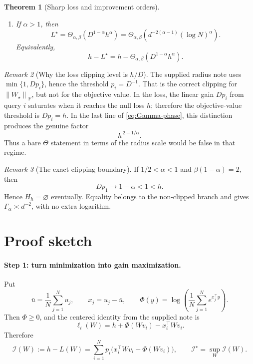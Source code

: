 \documentclass[11pt]{article}
\newtheorem{theorem}{Theorem}[section]
\theoremstyle{remark}
\newtheorem{remark}[theorem]{Remark}
\newcommand{\norm}[1]{\left\lVert #1\right\rVert}
\newcommand{\Frob}{\mathrm F}
\newcommand{\cI}{\mathcal I}
\begin{document}
\begin{theorem}[Sharp loss and improvement orders]
\begin{enumerate}[label=(\roman*)]
\item If \(\alpha>1\), then
\begin{equation}
 \boxed{\qquad
 L^\star
 =\Theta_{\alpha,\beta}\!\left(D^{1-\alpha}h^\alpha\right)
 =\Theta_{\alpha,\beta}\!\left(
 d^{-2(\alpha-1)}(\log N)^\alpha\right).
 \qquad}
 \label{eq:main-supercritical}
\end{equation}
Equivalently,
\[
 h-L^\star
 =h-\Theta_{\alpha,\beta}\!\left(D^{1-\alpha}h^\alpha\right).
\]
\end{enumerate}
\end{theorem}

\begin{remark}[Why the loss clipping level is \(h/D\)]
\label{rem:two-clippings}
The supplied radius note uses
\(\min\{1,Dp_i\}\), hence the threshold \(p_i=D^{-1}\).
That is the correct clipping for \(\norm{W_\star}_{\Frob}\), but not
for the objective value.  In the loss, the linear gain \(Dp_i\) from
query \(i\) saturates when it reaches the null loss \(h\); therefore
the objective-value threshold is \(Dp_i=h\).
In the last line of \eqref{eq:Gamma-phase}, this distinction produces
the genuine factor
\[
 h^{\,2-1/\alpha}.
\]
Thus a bare \(\Theta\) statement in terms of the radius scale would be
false in that regime.
\end{remark}

\begin{remark}[The exact clipping boundary]
If \(1/2<\alpha<1\) and \(\beta(1-\alpha)=2\), then
\[
 Dp_1\longrightarrow1-\alpha<1<h.
\]
Hence \(H_h=\varnothing\) eventually.  Equality belongs to the
non-clipped branch and gives \(\Gamma_\alpha\asymp d^{-2}\), with no
extra logarithm.
\end{remark}

\section{Proof sketch}
\label{sec:sketch}

\paragraph{Step 1: turn minimization into gain maximization.}
Put
\[
 \bar u=\frac1N\sum_{j=1}^Nu_j,\qquad x_j=u_j-\bar u,\qquad
 \Phi(y)=\log\left(\frac1N\sum_{j=1}^Ne^{x_j^\top y}\right).
\]
Then \(\Phi\geq0\), and the centered identity from the supplied note is
\[
 \ell_i(W)=h+\Phi(Wv_i)-x_i^\top Wv_i.
\]
Therefore
\begin{equation}
 \cI(W):=h-L(W)
 =\sum_{i=1}^Np_i
 \bigl(x_i^\top Wv_i-\Phi(Wv_i)\bigr),
 \qquad
 \cI^\star=\sup_W\cI(W).
 \label{eq:gain-representation}
\end{equation}
\end{document}
